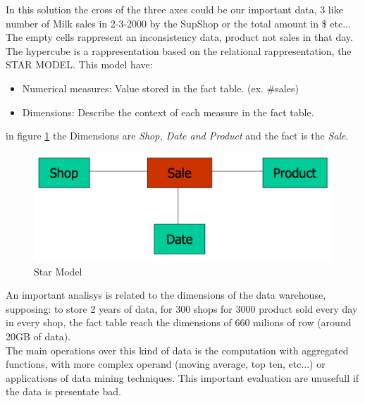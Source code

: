 \documentclass[12pt]{article}
\begin{document}
In this solution the cross of the three axes could be our important data, 3 like number of Milk sales in 2-3-2000 by the SupShop or the total amount in \$ etc... The empty cells rappresent an inconsistency data, product not sales in that day.\\
The hypercube is a rappresentation based on the relational rappresentation, the STAR MODEL. This model have:
\begin{itemize}
  \item Numerical measures: Value stored in the fact table. (ex. \#sales)
  \item Dimensions: Describe the context of each measure in the fact table.
\end{itemize}
in figure \ref{fig:star} the Dimensions are \textit{Shop, Date and Product} and the fact is the \textit{Sale}.\\
\begin{figure}[h!]
  \includegraphics[width=\linewidth]{images/star.png}
  \caption{Star Model}
  \label{fig:star}
\end{figure}
An important analisys is related to the dimensions of the data warehouse, supposing: to store 2 years of data, for 300 shops for 3000 product sold every day in every shop, the fact table reach the dimensions of 660 milions of row (around 20GB of data).\\
The main operations over this kind of data is the computation with aggregated functions, with more complex operand (moving average, top ten, etc...) or applications of data mining techniques. This important evaluation are unusefull if the data is presentate bad.
\end{document}

